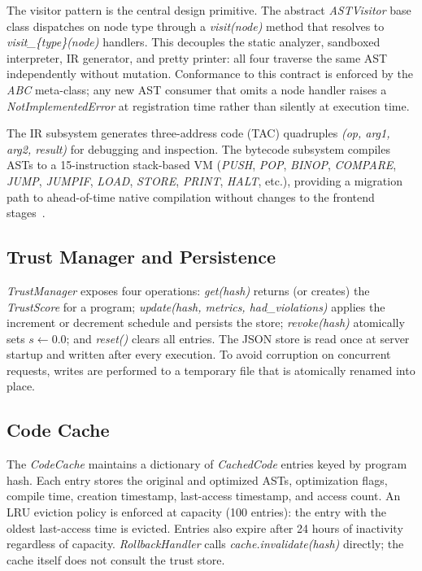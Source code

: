\documentclass[conference]{IEEEtran}
\begin{document}
The visitor pattern is the central design primitive. The abstract
\textit{ASTVisitor} base class dispatches on node type through a
\textit{visit(node)} method that resolves to
\textit{visit\_\{type\}(node)} handlers. This decouples the static
analyzer, sandboxed interpreter, IR generator, and pretty printer:
all four traverse the same AST independently without mutation.
Conformance to this contract is enforced by the \textit{ABC}
meta-class; any new AST consumer that omits a node handler raises a
\textit{NotImplementedError} at registration time rather than
silently at execution time.

The IR subsystem generates three-address code (TAC) quadruples
\textit{(op, arg1, arg2, result)} for debugging and inspection.
The bytecode subsystem compiles ASTs to a 15-instruction stack-based
VM (\textit{PUSH}, \textit{POP}, \textit{BINOP}, \textit{COMPARE},
\textit{JUMP}, \textit{JUMPIF}, \textit{LOAD}, \textit{STORE},
\textit{PRINT}, \textit{HALT}, etc.), providing a migration path
to ahead-of-time native compilation without changes to the frontend
stages~\cite{aho2007compilers}.

\subsection{Trust Manager and Persistence}

\textit{TrustManager} exposes four operations:
\textit{get(hash)} returns (or creates) the
\textit{TrustScore} for a program; \textit{update(hash, metrics,
had\_violations)} applies the increment or decrement schedule and
persists the store; \textit{revoke(hash)} atomically sets
$s\leftarrow0.0$; and \textit{reset()} clears all entries.
The JSON store is read once at server startup and written after
every execution. To avoid corruption on concurrent requests,
writes are performed to a temporary file that is atomically renamed
into place.

\subsection{Code Cache}

The \textit{CodeCache} maintains a dictionary of
\textit{CachedCode} entries keyed by program hash. Each entry
stores the original and optimized ASTs, optimization flags, compile
time, creation timestamp, last-access timestamp, and access count.
An LRU eviction policy is enforced at capacity (100 entries): the
entry with the oldest last-access time is evicted. Entries also
expire after 24 hours of inactivity regardless of capacity.
\textit{RollbackHandler} calls \textit{cache.invalidate(hash)}
directly; the cache itself does not consult the trust store.
\end{document}
